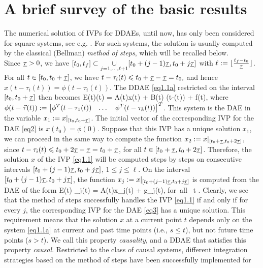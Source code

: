 \documentclass[final,reqno]{siamltex}
\begin{document}
\section{A brief survey of the basic results}
%
The numerical solution of IVPs for DDAEs, until now, has only been considered for square systems, see e.g. 
\cite{AscP95,BakPT02,CamL09,GugH07,Liu99,ShaG06,TiaYK11,ZhuP97,ZhuP98}. 
For such systems, the solution is usually computed by the classical (Bellman) \emph{method of steps}, which will be recalled below.\\
Since $\underline{\tau}>0$, we have $[t_0,t_f] \subset \underset{j=1,\dots,\ell+1}{\cup} [t_0+(j-1)\underline{\tau},t_0+j\underline{\tau}]$ 
with $\ell := \lfloor \frac{t_f-t_0}{\underline{\tau}} \rfloor$.
For all $t \in [t_0,t_0+\underline{\tau}]$, we have $t-\tau_i(t) \leqslant t_0 + \underline{\tau} - \underline{\tau} = t_0,$ and hence $x(t-\tau_i(t)) = \phi(t-\tau_i(t))$.
The DDAE \eqref{eq1.1a} restricted on the interval $[t_0,t_0+\underline{\tau}]$ then becomes
%
\be\label{eq2}
 E(t)(t) = A(t)x(t) + B(t) \phi(t-\vtau(t)) + f(t),
\ee
%
where $\phi(t-\vec{\tau}(t)) := \begin{bmatrix} \phi^T(t-\tau_1(t)) & \dots & \phi^T(t-\tau_k(t)) \end{bmatrix}^T$. 
This system is the DAE in the variable $x_1 := x|_{[t_0,t_0+\underline{\tau}]}$. The initial vector of the corresponding IVP for the DAE \eqref{eq2} is $x(t_0)=\phi(0)$.
Suppose that this IVP has a unique solution $x_1$, we can proceed in the same way to compute the function $x_2 := x|_{[t_0+\underline{\tau},t_0+2\underline{\tau}]}$, since 
$t-\tau_i(t) \leqslant t_0 + 2 \underline{\tau} - \underline{\tau} = t_0+\underline{\tau}$, for all $t\in [t_0+\underline{\tau},t_0+2\underline{\tau}]$. Therefore, the solution $x$ of the IVP \eqref{eq1.1} will be 
computed steps by steps on consecutive intervals $[t_0+(j-1)\underline{\tau},t_0+j\underline{\tau}]$, $1\leq j\leq \ell$. 
On the interval $[t_0+(j-1)\underline{\tau},t_0+j\underline{\tau}]$, the function $x_j := x|_{[t_0+(j-1)\underline{\tau},t_0+j\underline{\tau}]}$ is computed from the DAE of the form
%
\be\label{eq3}
 E(t) _j(t) = A(t)x_j(t) + g_j(t), \quad \mbox{for all } t .
\ee
%
Clearly, we see that the method of steps successfully handles the IVP \eqref{eq1.1} if and only if for every $j$, the corresponding IVP for the 
DAE \eqref{eq3} has a unique solution.
This requirement means that the solution $x$ at a current point $t$ depends only on the system \eqref{eq1.1a} 
at current and past time points (i.e., $s \leq t$), but not future time points ($s > t$). We call this property \emph{causality}, and 
a DDAE that satisfies this property \emph{causal}. 
Restricted to the class of causal systems, different integration strategies based on the method of steps have been successfully implemented for 
\end{document}
